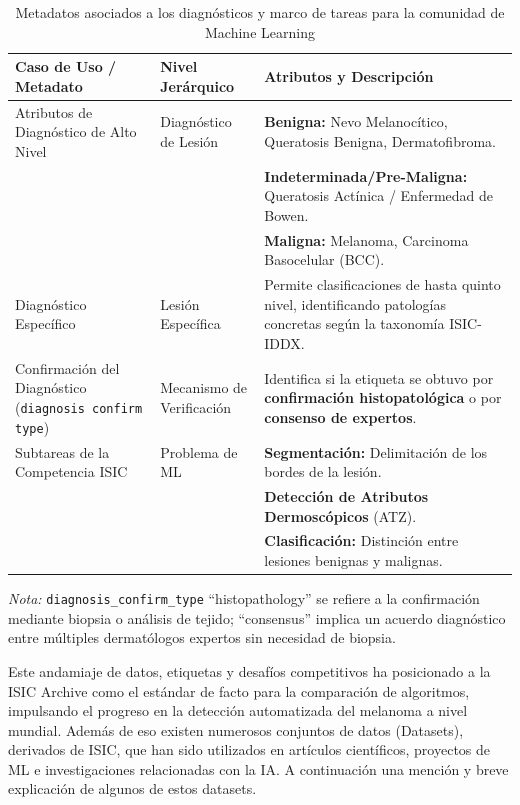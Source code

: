 \begin{table}[ht]
    \centering
    \caption{Metadatos asociados a los diagnósticos y marco de tareas para la comunidad de Machine Learning}
    \label{tab:isic_atributos}
    \begin{tabularx}{\textwidth}{|>{\raggedright\arraybackslash}p{3.2cm}|>{\raggedright\arraybackslash}p{2.8cm}|>{\raggedright\arraybackslash}X|}
        \hline
        \textbf{Caso de Uso / Metadato} & \textbf{Nivel Jerárquico} & \textbf{Atributos y Descripción} \\
        \hline
        Atributos de Diagnóstico de Alto Nivel & Diagnóstico de Lesión & \textbf{Benigna:} Nevo Melanocítico, Queratosis Benigna, Dermatofibroma. \\
        & & \textbf{Indeterminada/Pre-Maligna:} Queratosis Actínica / Enfermedad de Bowen. \\
        & & \textbf{Maligna:} Melanoma, Carcinoma Basocelular (BCC). \\
        \hline
        Diagnóstico Específico & Lesión Específica & Permite clasificaciones de hasta quinto nivel, identificando patologías concretas según la taxonomía ISIC-IDDX. \\
        \hline
        Confirmación del Diagnóstico (\texttt{diagnosis confirm type}) & Mecanismo de Verificación & Identifica si la etiqueta se obtuvo por \textbf{confirmación histopatológica} o por \textbf{consenso de expertos}. \\
        \hline
        Subtareas de la Competencia ISIC & Problema de ML & \textbf{Segmentación:} Delimitación de los bordes de la lesión. \\
        & & \textbf{Detección de Atributos Dermoscópicos} (ATZ). \\
        & & \textbf{Clasificación:} Distinción entre lesiones benignas y malignas. \\
        \hline
    \end{tabularx}
    \small{\textit{Nota:} \texttt{diagnosis\_confirm\_type} ``histopathology'' se refiere a la confirmación mediante biopsia o análisis de tejido; ``consensus'' implica un acuerdo diagnóstico entre múltiples dermatólogos expertos sin necesidad de biopsia.}
\end{table}

Este andamiaje de datos, etiquetas y desafíos competitivos ha posicionado a la ISIC Archive 
como el estándar de facto para la comparación de algoritmos, impulsando el progreso en la 
detección automatizada del melanoma a nivel mundial. Adem\'as de eso existen numerosos conjuntos
de datos (Datasets), derivados de ISIC, que han sido utilizados en art\'iculos cient\'ificos,
proyectos de ML e investigaciones relacionadas con la IA. A continuaci\'on una menci\'on y breve
explicaci\'on de algunos de estos datasets.

